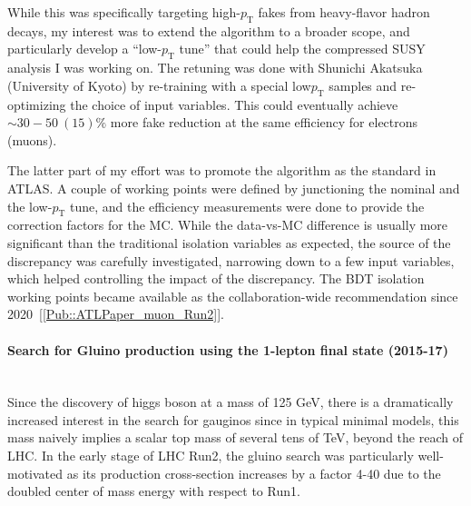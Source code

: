 \documentclass[12pt]{article}
\newcommand{\Subsubsection}[1]{\subsubsection*{#1}
\addcontentsline{toc}{subsubsection}{#1}}
\newcommand{\pt}{\ensuremath{p_{\text{T}}}\xspace}
\begin{document}
While this was specifically targeting high-\pt fakes from heavy-flavor hadron decays,
my interest was to extend the algorithm to a broader scope, and particularly develop a ``low-\pt tune'' that could help the compressed SUSY analysis I was working on.
The retuning was done with Shunichi Akatsuka (University of Kyoto) by re-training with a special low\pt samples and re-optimizing the choice of input variables.
This could eventually achieve $\sim 30-50~(15)\%$ more fake reduction at the same efficiency for electrons (muons). 

The latter part of my effort was to promote the algorithm as the standard in ATLAS.
A couple of working points were defined by junctioning the nominal and the low-\pt tune, and the efficiency measurements were done to provide the correction factors for the MC.
While the data-vs-MC difference is usually more significant than the traditional isolation variables as expected, the source of the discrepancy was carefully investigated, narrowing down to a few input variables, which helped controlling the impact of the discrepancy.
The BDT isolation working points became available as the collaboration-wide recommendation since 2020~[\ref{Pub::ATLPaper_muon_Run2}].


\paragraph{Search for Gluino production using the 1-lepton final state (2015-17)}  \phantom{k} \vspace{3mm} \\
Since the discovery of higgs boson at a mass of 125 GeV, there is a dramatically increased interest in the search for gauginos since in typical minimal models, this mass naively implies a scalar top mass of several tens of TeV, beyond the reach of LHC. In the early stage of LHC Run2, the gluino search was particularly well-motivated as its production cross-section increases by a factor 4-40 due to the doubled center of mass energy with respect to Run1. 
\end{document}
